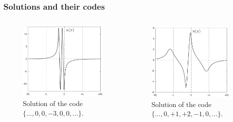 \documentclass [10pt] {beamer}
\begin{document}
\begin{frame}
	\frametitle{Solutions and their codes}
	\begin{columns}[T]
		\begin{column}{.5\textwidth}
			\begin{figure}
			\includegraphics[width = 1\textwidth]{pic/solution-3.pdf}
			\caption{Solution of the code $\{\dots, 0, 0, -3, 0, 0, \dots\}$.}
			\end{figure}
		\end{column}
		\begin{column}{.5\textwidth}
			\begin{figure}
			\includegraphics[width = 1\textwidth]{pic/solution-4.pdf}
			\caption{Solution of the code $\{\dots, 0, +1, +2, -1, 0, \dots\}$.}
			\end{figure}
		\end{column}
	\end{columns}
\end{frame}
\end{document}
